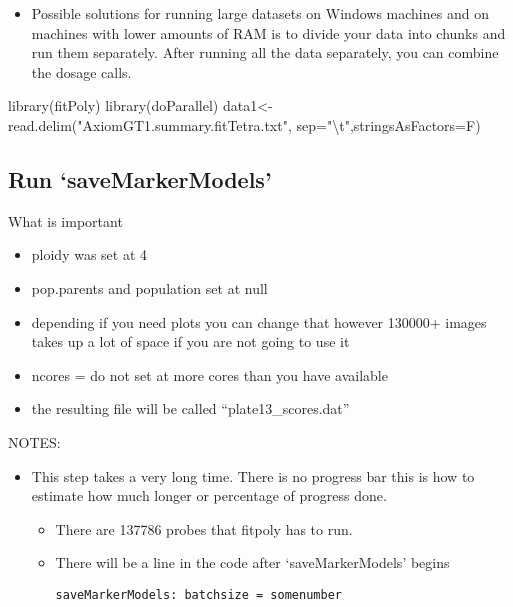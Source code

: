 \documentclass[
]{article}
\newenvironment{Shaded}{\begin{snugshade}}{\end{snugshade}}
\newcommand{\AttributeTok}[1]{\textcolor[rgb]{0.77,0.63,0.00}{#1}}
\newcommand{\FunctionTok}[1]{\textcolor[rgb]{0.00,0.00,0.00}{#1}}
\newcommand{\NormalTok}[1]{#1}
\newcommand{\OtherTok}[1]{\textcolor[rgb]{0.56,0.35,0.01}{#1}}
\newcommand{\SpecialCharTok}[1]{\textcolor[rgb]{0.00,0.00,0.00}{#1}}
\newcommand{\StringTok}[1]{\textcolor[rgb]{0.31,0.60,0.02}{#1}}
\providecommand{\tightlist}{%
  \setlength{\itemsep}{0pt}\setlength{\parskip}{0pt}}
\begin{document}
\begin{itemize}
\tightlist
\item
  Possible solutions for running large datasets on Windows machines and
  on machines with lower amounts of RAM is to divide your data into
  chunks and run them separately. After running all the data separately,
  you can combine the dosage calls.
\end{itemize}

\begin{Shaded}
\begin{Highlighting}[]
\FunctionTok{library}\NormalTok{(fitPoly)}
\FunctionTok{library}\NormalTok{(doParallel)}
\NormalTok{data1}\OtherTok{\textless{}{-}}\FunctionTok{read.delim}\NormalTok{(}\StringTok{"AxiomGT1.summary.fitTetra.txt"}\NormalTok{,}
                 \AttributeTok{sep=}\StringTok{"}\SpecialCharTok{\textbackslash{}t}\StringTok{"}\NormalTok{,}\AttributeTok{stringsAsFactors=}\NormalTok{F)}
\end{Highlighting}
\end{Shaded}

\hypertarget{run-savemarkermodels}{%
\subsection{Run `saveMarkerModels'}\label{run-savemarkermodels}}

What is important

\begin{itemize}
\item
  ploidy was set at 4
\item
  pop.parents and population set at null
\item
  depending if you need plots you can change that however 130000+ images
  takes up a lot of space if you are not going to use it
\item
  ncores = do not set at more cores than you have available
\item
  the resulting file will be called ``plate13\_scores.dat''
\end{itemize}

NOTES:

\begin{itemize}
\item
  This step takes a very long time. There is no progress bar this is how
  to estimate how much longer or percentage of progress done.

  \begin{itemize}
  \item
    There are 137786 probes that fitpoly has to run.
  \item
    There will be a line in the code after `saveMarkerModels' begins

\begin{verbatim}
saveMarkerModels: batchsize = somenumber
\end{verbatim}
  \end{itemize}
\end{itemize}
\end{document}

